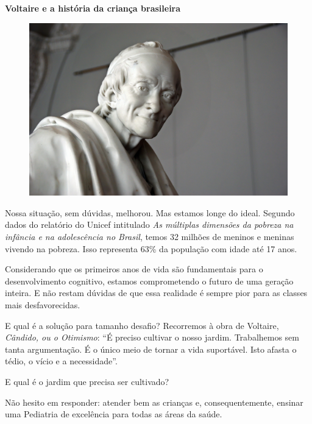 \begin{myquote}

\textbf{Voltaire e a história da criança brasileira}

\begin{figure}[H]
\centering
\includegraphics[scale=0.25]{./imgSAEB_7_POR/media/image46.png}
\end{figure}

Nossa situação, sem dúvidas, melhorou. Mas estamos longe do ideal. Segundo
dados do relatório do Unicef intitulado \textit{As múltiplas dimensões da pobreza na
infância e na adolescência no Brasil}, temos 32 milhões de meninos e meninas
vivendo na pobreza. Isso representa 63\% da população com idade até 17 anos.

Considerando que os primeiros anos de vida são fundamentais para o
desenvolvimento cognitivo, estamos comprometendo o futuro de uma geração
inteira. E não restam dúvidas de que essa realidade é sempre pior para as
classes mais desfavorecidas.

E qual é a solução para tamanho desafio? Recorremos à obra de
Voltaire, \textit{Cândido, ou o Otimismo}: ``É preciso cultivar o nosso jardim.
Trabalhemos sem tanta argumentação. É o único meio de tornar a vida
suportável. Isto afasta o tédio, o vício e a necessidade''.

E qual é o jardim que precisa ser cultivado? 

Não hesito em responder: atender bem as crianças e, consequentemente, ensinar
uma Pediatria de excelência para todas as áreas da saúde.


\end{myquote}

